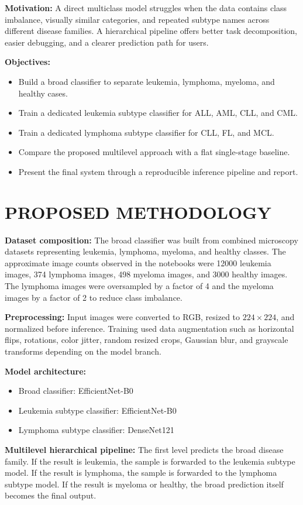 \documentclass[12pt,a4paper]{report}
\newcommand{\templchapter}[1]{%
    \section*{#1}%
    \addcontentsline{toc}{section}{#1}%
}
\begin{document}
\textbf{Motivation:} A direct multiclass model struggles when the data contains class imbalance, visually similar categories, and repeated subtype names across different disease families. A hierarchical pipeline offers better task decomposition, easier debugging, and a clearer prediction path for users.

\textbf{Objectives:}
\begin{itemize}[leftmargin=1.5em]
    \item Build a broad classifier to separate leukemia, lymphoma, myeloma, and healthy cases.
    \item Train a dedicated leukemia subtype classifier for ALL, AML, CLL, and CML.
    \item Train a dedicated lymphoma subtype classifier for CLL, FL, and MCL.
    \item Compare the proposed multilevel approach with a flat single-stage baseline.
    \item Present the final system through a reproducible inference pipeline and report.
\end{itemize}

\templchapter{PROPOSED METHODOLOGY}
\textbf{Dataset composition:} The broad classifier was built from combined microscopy datasets representing leukemia, lymphoma, myeloma, and healthy classes. The approximate image counts observed in the notebooks were 12000 leukemia images, 374 lymphoma images, 498 myeloma images, and 3000 healthy images. The lymphoma images were oversampled by a factor of 4 and the myeloma images by a factor of 2 to reduce class imbalance.

\textbf{Preprocessing:} Input images were converted to RGB, resized to $224 \times 224$, and normalized before inference. Training used data augmentation such as horizontal flips, rotations, color jitter, random resized crops, Gaussian blur, and grayscale transforms depending on the model branch.

\textbf{Model architecture:}
\begin{itemize}[leftmargin=1.5em]
    \item Broad classifier: EfficientNet-B0
    \item Leukemia subtype classifier: EfficientNet-B0
    \item Lymphoma subtype classifier: DenseNet121
\end{itemize}

\textbf{Multilevel hierarchical pipeline:} The first level predicts the broad disease family. If the result is leukemia, the sample is forwarded to the leukemia subtype model. If the result is lymphoma, the sample is forwarded to the lymphoma subtype model. If the result is myeloma or healthy, the broad prediction itself becomes the final output.
\end{document}
